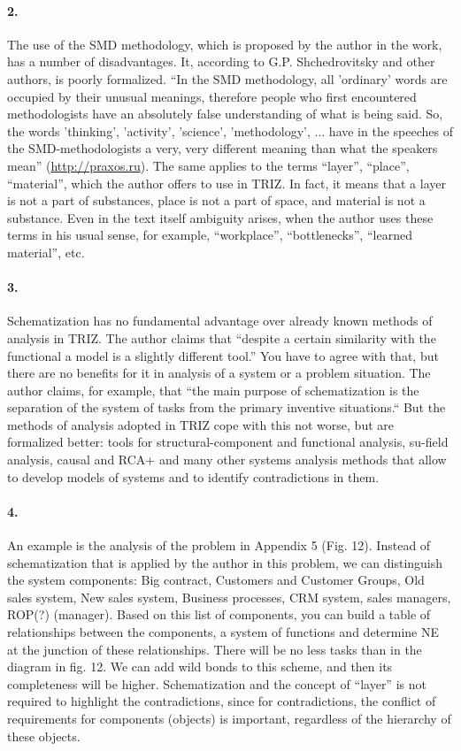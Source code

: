 \documentclass[11pt,a4paper]{article}
\begin{document}
\paragraph{2.}
The use of the SMD methodology, which is proposed by the author in the work,
has a number of disadvantages. It, according to G.P. Shchedrovitsky and other
authors, is poorly formalized.  “In the SMD methodology, all 'ordinary' words
are occupied by their unusual meanings, therefore people who first encountered
methodologists have an absolutely false understanding of what is being said.
So, the words 'thinking', 'activity', 'science', 'methodology', ... have in
the speeches of the SMD-methodologists a very, very different meaning than
what the speakers mean” (\url{http://praxos.ru}). The same applies to the
terms “layer”, “place”, “material”, which the author offers to use in TRIZ. In
fact, it means that a layer is not a part of substances, place is not a part
of space, and material is not a substance. Even in the text itself ambiguity
arises, when the author uses these terms in his usual sense, for example,
“workplace”, “bottlenecks”, “learned material”, etc.

\paragraph{3.}
Schematization has no fundamental advantage over already known methods of
analysis in TRIZ. The author claims that “despite a certain similarity with
the functional a model is a slightly different tool.” You have to agree with
that, but there are no benefits for it in analysis of a system or a problem
situation. The author claims, for example, that “the main purpose of
schematization is the separation of the system of tasks from the primary
inventive situations.“ But the methods of analysis adopted in TRIZ cope with
this not worse, but are formalized better: tools for structural-component and
functional analysis, su-field analysis, causal and RCA+ and many other systems
analysis methods that allow to develop models of systems and to identify
contradictions in them.

\paragraph{4.}
An example is the analysis of the problem in Appendix 5 (Fig. 12). Instead of
schematization that is applied by the author in this problem, we can
distinguish the system components: Big contract, Customers and Customer
Groups, Old sales system, New sales system, Business processes, CRM system,
sales managers, ROP(?) (manager). Based on this list of components, you can
build a table of relationships between the components, a system of functions
and determine NE at the junction of these relationships. There will be no less
tasks than in the diagram in fig. 12. We can add wild bonds to this scheme,
and then its completeness will be higher. Schematization and the concept of
“layer” is not required to highlight the contradictions, since for
contradictions, the conflict of requirements for components (objects) is
important, regardless of the hierarchy of these objects.
\end{document}
